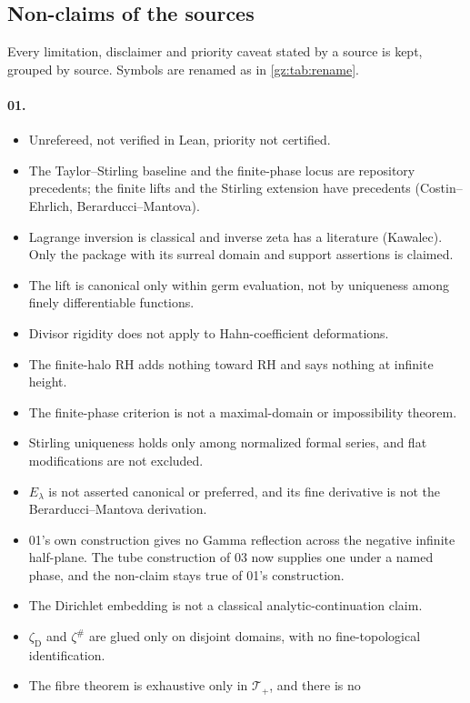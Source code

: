 \documentclass[11pt,a4paper]{article}
\numberwithin{equation}{section}
\theoremstyle{definition}
\theoremstyle{remark}
\newcommand{\zD}{\zeta_{\mathrm D}}
\newcommand{\zp}{\zeta^{\#}}
\newcommand{\Tp}{\mathcal T_{+}}
\begin{document}
\subsection{Non-claims of the sources}
Every limitation, disclaimer and priority caveat stated by a source is kept,
grouped by source. Symbols are renamed as in \cref{gz:tab:rename}.

\paragraph{01.}
\begin{itemize}
\item Unrefereed, not verified in Lean, priority not certified.
\item The Taylor--Stirling baseline and the finite-phase locus are
 repository precedents; the finite lifts and the Stirling extension have
 precedents (Costin--Ehrlich, Berarducci--Mantova).
\item Lagrange inversion is classical and inverse zeta has a literature
 (Kawalec). Only the package with its surreal domain and support assertions
 is claimed.
\item The lift is canonical only within germ evaluation, not by uniqueness
 among finely differentiable functions.
\item Divisor rigidity does not apply to Hahn-coefficient deformations.
\item The finite-halo RH adds nothing toward RH and says nothing at infinite
 height.
\item The finite-phase criterion is not a maximal-domain or impossibility
 theorem.
\item Stirling uniqueness holds only among normalized formal series, and flat
 modifications are not excluded.
\item $E_\lambda$ is not asserted canonical or preferred, and its fine
 derivative is not the Berarducci--Mantova derivation.
\item 01's own construction gives no Gamma reflection across the negative
 infinite half-plane. The tube construction of 03 now supplies one under a
 named phase, and the non-claim stays true of 01's construction.
\item The Dirichlet embedding is not a classical analytic-continuation claim.
\item $\zD$ and $\zp$ are glued only on disjoint domains, with no
 fine-topological identification.
\item The fibre theorem is exhaustive only in $\Tp$, and there is no

\end{itemize}
\end{document}
